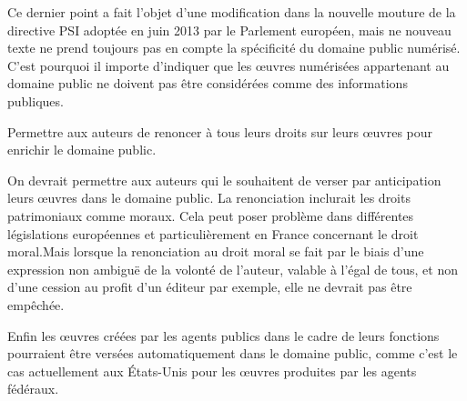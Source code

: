 Ce dernier point a fait l'objet d'une modification dans la nouvelle mouture de la directive PSI adoptée en juin 2013 par le Parlement européen, mais ne nouveau texte ne prend toujours pas en compte la spécificité du domaine public numérisé. C'est pourquoi il importe d'indiquer que les œuvres numérisées appartenant au domaine public ne doivent pas être considérées comme des informations publiques.

\begin{mesure}
Permettre aux auteurs de renoncer à tous leurs droits sur leurs œuvres pour enrichir le domaine public.
\end{mesure}

On devrait permettre aux auteurs qui le souhaitent de verser par anticipation leurs œuvres dans le domaine public. La renonciation inclurait les droits patrimoniaux comme moraux. Cela peut poser problème dans différentes législations européennes et particulièrement en France concernant le droit moral.Mais lorsque la renonciation au droit moral se fait par le biais d'une expression non ambiguë de la volonté de l'auteur, valable à l'égal de tous, et non d'une cession au profit d'un éditeur par exemple, elle ne devrait pas être empêchée.

Enfin les œuvres créées par les agents publics dans le cadre de leurs fonctions pourraient être versées automatiquement dans le domaine public, comme c’est le cas actuellement aux États-Unis pour les œuvres produites par les agents fédéraux. 







